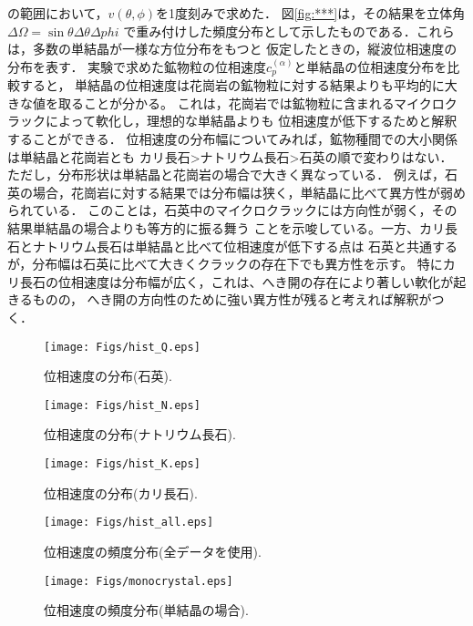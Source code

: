の範囲において，$v(\theta, \phi)$を1度刻みで求めた．
図\ref{fig:***}は，その結果を立体角$\Delta \Omega = \sin\theta \Delta \theta \Delta phi$
で重み付けした頻度分布として示したものである．これらは，多数の単結晶が一様な方位分布をもつと
仮定したときの，縦波位相速度の分布を表す．
実験で求めた鉱物粒の位相速度$c^{(\alpha)}_p$と単結晶の位相速度分布を比較すると，
単結晶の位相速度は花崗岩の鉱物粒に対する結果よりも平均的に大きな値を取ることが分かる。
これは，花崗岩では鉱物粒に含まれるマイクロクラックによって軟化し，理想的な単結晶よりも
位相速度が低下するためと解釈することができる．
位相速度の分布幅についてみれば，鉱物種間での大小関係は単結晶と花崗岩とも
カリ長石>ナトリウム長石>石英の順で変わりはない．
ただし，分布形状は単結晶と花崗岩の場合で大きく異なっている．
例えば，石英の場合，花崗岩に対する結果では分布幅は狭く，単結晶に比べて異方性が弱められている．
このことは，石英中のマイクロクラックには方向性が弱く，その結果単結晶の場合よりも等方的に振る舞う
ことを示唆している。一方、カリ長石とナトリウム長石は単結晶と比べて位相速度が低下する点は
石英と共通するが，分布幅は石英に比べて大きくクラックの存在下でも異方性を示す。
特にカリ長石の位相速度は分布幅が広く，これは、へき開の存在により著しい軟化が起きるものの，
へき開の方向性のために強い異方性が残ると考えれば解釈がつく．
\begin{figure}
\begin{center}
	\texttt{[image: Figs/hist\_Q.eps]}
	\caption{位相速度の分布(石英).}
	\label{fig:fig10}
\end{center}
	\vspace{-10mm}
\end{figure}
\begin{figure}
\begin{center}
	\texttt{[image: Figs/hist\_N.eps]}
	\caption{位相速度の分布(ナトリウム長石).}
	\label{fig:fig11}
\end{center}
	\vspace{-10mm}
\end{figure}
\begin{figure}
\begin{center}
	\texttt{[image: Figs/hist\_K.eps]}
	\caption{位相速度の分布(カリ長石).}
	\label{fig:fig12}
\end{center}
	\vspace{-10mm}
\end{figure}
\begin{figure}
\begin{center}
	\texttt{[image: Figs/hist\_all.eps]}
	\caption{位相速度の頻度分布(全データを使用).}
	\label{fig:fig13}
\end{center}
	\vspace{-10mm}
\end{figure}
\begin{figure}
\begin{center}
	\texttt{[image: Figs/monocrystal.eps]}
	\caption{位相速度の頻度分布(単結晶の場合).}
	\label{fig:fig14}
\end{center}
	\vspace{-10mm}
\end{figure}

